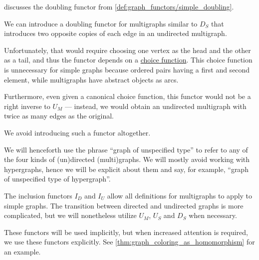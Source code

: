 \begin{comments}
  \item {} discusses the doubling functor from \cref{def:graph_functors/simple_doubling}.

  \item We can introduce a doubling functor for multigraphs similar to \hyperref[def:graph_functors/simple_doubling]{\( D_S \)} that introduces two opposite copies of each edge in an undirected multigraph.

  Unfortunately, that would require choosing one vertex as the head and the other as a tail, and thus the functor depends on a \hyperref[def:choice_function]{choice function}. This choice function is unnecessary for simple graphs because ordered pairs having a first and second element, while multigraphs have abstract objects as arcs.

  Furthermore, even given a canonical choice function, this functor would not be a right inverse to \hyperref[def:graph_functors/multi_forgetful]{\( U_M \)} --- instead, we would obtain an undirected multigraph with twice as many edges as the original.

  We avoid introducing such a functor altogether.
\end{comments}

\begin{remark}\label{rem:graph_of_unspecified_type}
  We will henceforth use the phrase \enquote{graph of unspecified type} to refer to any of the four kinds of (un)directed (multi)graphs. We will mostly avoid working with hypergraphs, hence we will be explicit about them and say, for example, \enquote{graph of unspecified type of hypergraph}.

  The inclusion functors \hyperref[def:graph_functors/directed_inclusion]{\( I_D \)} and \hyperref[def:graph_functors/undirected_inclusion]{\( I_U \)} allow all definitions for multigraphs to apply to simple graphs. The transition between directed and undirected graphs is more complicated, but we will nonetheless utilize \hyperref[def:graph_functors/multi_forgetful]{\( U_M \)}, \hyperref[def:graph_functors/simple_forgetful]{\( U_S \)} and \hyperref[def:graph_functors/simple_doubling]{\( D_S \)} when necessary.

  These functors will be used implicitly, but when increased attention is required, we use these functors explicitly. See \cref{thm:graph_coloring_as_homomorphism} for an example.
\end{remark}

